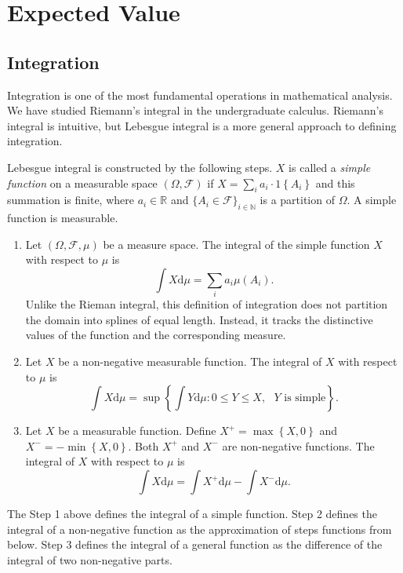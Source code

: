 \documentclass[11pt]{article}
\begin{document}
    \section{Expected Value}\label{expected-value}

\subsection{Integration}\label{integration}

Integration is one of the most fundamental operations in mathematical
analysis. We have studied Riemann's integral in the undergraduate
calculus. Riemann's integral is intuitive, but Lebesgue integral is a
more general approach to defining integration.

Lebesgue integral is constructed by the following steps. \(X\) is called
a \emph{simple function} on a measurable space
\(\left(\Omega,\mathcal{F}\right)\) if
\(X=\sum_{i}a_{i}\cdot 1\left\{ A_{i}\right\}\) and this summation is
finite, where \(a_{i}\in\mathbb{R}\) and
\(\{ A_i\in\mathcal{F} \}_{i\in \mathbb{N}}\) is a partition of
\(\Omega\). A simple function is measurable.

\begin{enumerate}
\def\labelenumi{\arabic{enumi}.}
\item
  Let \(\left(\Omega,\mathcal{F},\mu\right)\) be a measure space. The
  integral of the simple function \(X\) with respect to \(\mu\) is
  \[\int X\mathrm{d}\mu=\sum_{i}a_{i}\mu\left(A_{i}\right).\] Unlike the
  Rieman integral, this definition of integration does not partition the
  domain into splines of equal length. Instead, it tracks the
  distinctive values of the function and the corresponding measure.
\item
  Let \(X\) be a non-negative measurable function. The integral of \(X\)
  with respect to \(\mu\) is
  \[\int X\mathrm{d}\mu=\sup\left\{ \int Y\mathrm{d}\mu:0\leq Y\leq X,\text{ }Y\text{ is simple}\right\} .\]
\item
  Let \(X\) be a measurable function. Define
  \(X^{+}=\max\left\{ X,0\right\}\) and
  \(X^{-}=-\min\left\{ X,0\right\}\). Both \(X^{+}\) and \(X^{-}\) are
  non-negative functions. The integral of \(X\) with respect to \(\mu\)
  is
  \[\int X\mathrm{d}\mu=\int X^{+}\mathrm{d}\mu-\int X^{-}\mathrm{d}\mu.\]
\end{enumerate}

The Step 1 above defines the integral of a simple function. Step 2
defines the integral of a non-negative function as the approximation of
steps functions from below. Step 3 defines the integral of a general
function as the difference of the integral of two non-negative parts.
\end{document}
